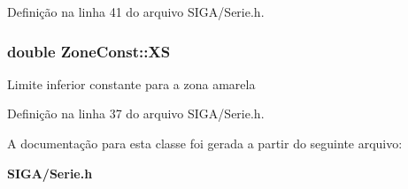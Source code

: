 Definição na linha 41 do arquivo S\+I\+G\+A/\+Serie.\+h.

\subsubsection[{XS}]{\setlength{\rightskip}{0pt plus 5cm}double Zone\+Const\+::\+XS}\label{class_zone_const_a36de1b0d8c01feca76c14a4134d42c19}
Limite inferior constante para a zona amarela 

Definição na linha 37 do arquivo S\+I\+G\+A/\+Serie.\+h.



A documentação para esta classe foi gerada a partir do seguinte arquivo\+:\begin{DoxyCompactItemize}
\item 
{\bf S\+I\+G\+A/\+Serie.\+h}\end{DoxyCompactItemize}
